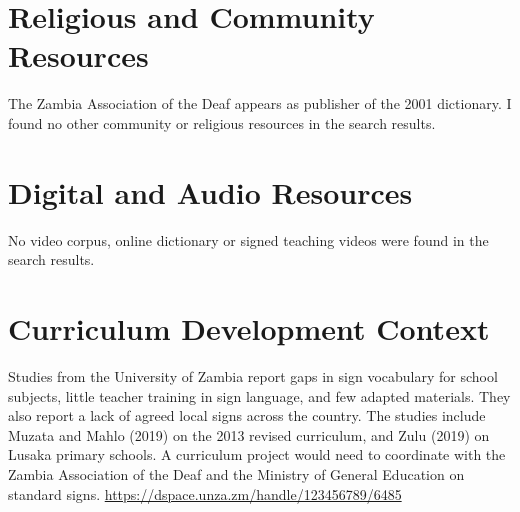 \documentclass[12pt]{article}
\begin{document}
\section{Religious and Community Resources}
The Zambia Association of the Deaf appears as publisher of the 2001 dictionary. I found no other community or religious resources in the search results.

\section{Digital and Audio Resources}
No video corpus, online dictionary or signed teaching videos were found in the search results.

\section{Curriculum Development Context}
Studies from the University of Zambia report gaps in sign vocabulary for school subjects, little teacher training in sign language, and few adapted materials. They also report a lack of agreed local signs across the country. The studies include Muzata and Mahlo (2019) on the 2013 revised curriculum, and Zulu (2019) on Lusaka primary schools. A curriculum project would need to coordinate with the Zambia Association of the Deaf and the Ministry of General Education on standard signs. \url{https://dspace.unza.zm/handle/123456789/6485}
\end{document}

